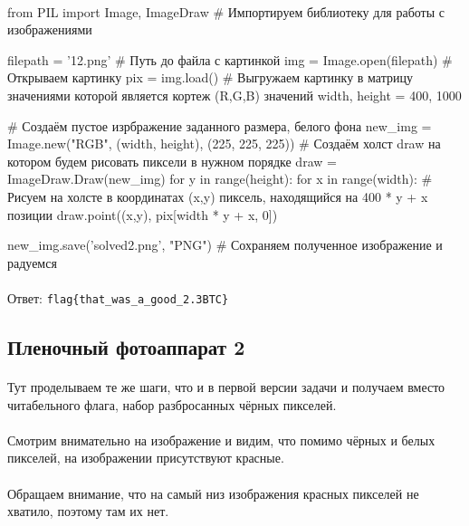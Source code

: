 \documentclass[12pt]{article}
\begin{document}
    \paragraph{}

    \begin{pythoncode}
from PIL import Image, ImageDraw  # Импортируем библиотеку для работы с изображениями

filepath = '12.png'         # Путь до файла с картинкой
img = Image.open(filepath)  # Открываем картинку
pix = img.load()            # Выгружаем картинку в матрицу значениями которой является кортеж (R,G,B) значений
width, height = 400, 1000

# Создаём пустое изрбражение заданного размера, белого фона
new_img = Image.new("RGB", (width, height), (225, 225, 225))
# Создаём холст draw на котором будем рисовать пиксели в нужном порядке
draw = ImageDraw.Draw(new_img)
for y in range(height):
    for x in range(width):
        # Рисуем на холсте в координатах (x,y) пиксель, находящийся на 400 * y + x позиции
        draw.point((x,y), pix[width * y + x, 0])

new_img.save('solved2.png', "PNG")  # Сохраняем полученное изображение и радуемся
    \end{pythoncode}
    \paragraph{}
    Ответ: \verb|flag{that_was_a_good_2.3BTC}|

    \subsection{Пленочный фотоаппарат 2}
    \paragraph{} %
    Тут проделываем те же шаги, что и в первой версии задачи и получаем вместо читабельного флага,
    набор разбросанных чёрных пикселей.
    \paragraph{}
    Смотрим внимательно на изображение и видим, что помимо чёрных и белых пикселей,
    на изображении присутствуют красные.
    \paragraph{}
    Обращаем внимание, что на самый низ изображения красных пикселей не хватило, поэтому там их нет.
\end{document}

